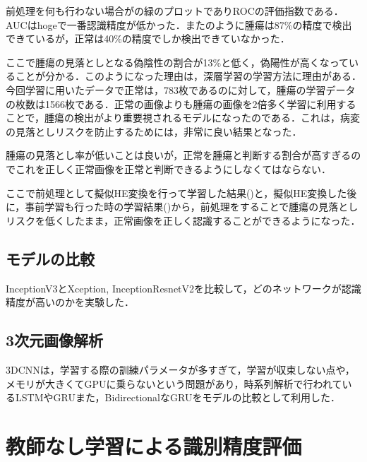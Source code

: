 前処理を何も行わない場合がの緑のプロットでありROCの評価指数である．AUCはhogeで一番認識精度が低かった．またのように腫瘍は87\%の精度で検出できているが，正常は40\%の精度でしか検出できていなかった．

ここで腫瘍の見落としとなる偽陰性の割合が13\%と低く，偽陽性が高くなっていることが分かる．このようになった理由は，深層学習の学習方法に理由がある．今回学習に用いたデータで正常は，783枚であるのに対して，腫瘍の学習データの枚数は1566枚である．正常の画像よりも腫瘍の画像を2倍多く学習に利用することで，腫瘍の検出がより重要視されるモデルになったのである．これは，病変の見落としリスクを防止するためには，非常に良い結果となった．

腫瘍の見落とし率が低いことは良いが，正常を腫瘍と判断する割合が高すぎるのでこれを正しく正常画像を正常と判断できるようにしなくてはならない．

ここで前処理として擬似HE変換を行って学習した結果()と，擬似HE変換した後に，事前学習も行った時の学習結果()から，前処理をすることで腫瘍の見落としリスクを低くしたまま，正常画像を正しく認識することができるようになった．

\subsection*{モデルの比較}
InceptionV3とXception, InceptionResnetV2を比較して，どのネットワークが認識精度が高いのかを実験した．

\subsection{3次元画像解析}
3DCNNは，学習する際の訓練パラメータが多すぎて，学習が収束しない点や，メモリが大きくてGPUに乗らないという問題があり，時系列解析で行われているLSTMやGRUまた，BidirectionalなGRUをモデルの比較として利用した．

\section{教師なし学習による識別精度評価}
